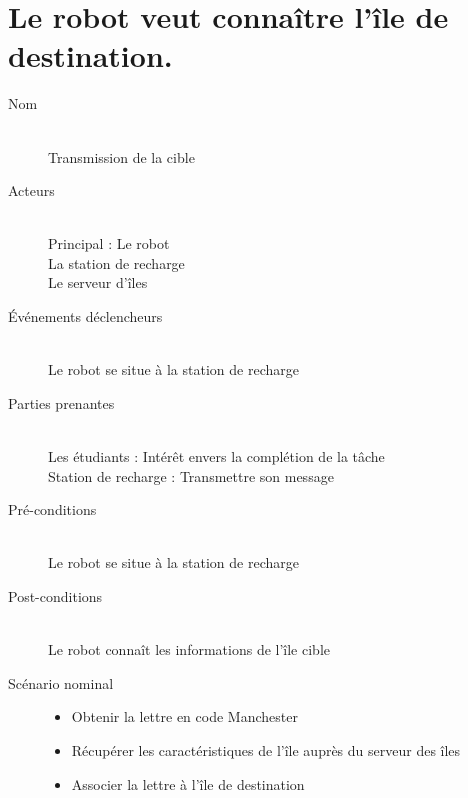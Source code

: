 \section{Le robot veut connaître l'île de destination.}
\begin{description}
\item[Nom] \hfill \\
  Transmission de la cible
\item[Acteurs] \hfill \\
  Principal : Le robot \\
  La station de recharge \\
  Le serveur d'îles
\item[Événements déclencheurs] \hfill \\
  Le robot se situe à la station de recharge
\item[Parties prenantes] \hfill \\
  Les étudiants : Intérêt envers la complétion de la tâche \\
  Station de recharge : Transmettre son message
\item[Pré-conditions] \hfill \\
  Le robot se situe à la station de recharge
\item[Post-conditions] \hfill \\
  Le robot connaît les informations de l'île cible
\item[Scénario nominal] \hfill
  \begin{itemize}
  \item Obtenir la lettre en code Manchester
  \item Récupérer les caractéristiques de l'île auprès du serveur des îles
  \item Associer la lettre à l'île de destination
  \end{itemize}
\end{description}

